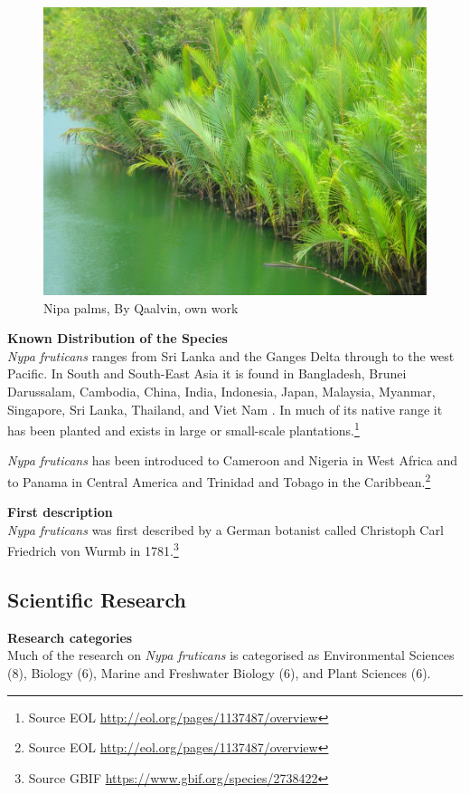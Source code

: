 \documentclass[openany]{book}
\let\rmarkdownfootnote\footnote%
\def\footnote{\protect\rmarkdownfootnote}
\theoremstyle{definition}
\theoremstyle{definition}
\theoremstyle{definition}
\theoremstyle{remark}
\begin{document}
\begin{figure}

{\centering \includegraphics[width=0.7\linewidth]{images_species/Nipa_palms} 

}

\caption{Nipa palms, By Qaalvin, own work}\label{fig:unnamed-chunk-6}
\end{figure}

\textbf{Known Distribution of the Species}\\
\emph{Nypa fruticans} ranges from Sri Lanka and the Ganges Delta through
to the west Pacific. In South and South-East Asia it is found in
Bangladesh, Brunei Darussalam, Cambodia, China, India, Indonesia, Japan,
Malaysia, Myanmar, Singapore, Sri Lanka, Thailand, and Viet Nam . In
much of its native range it has been planted and exists in large or
small-scale plantations.\footnote{Source EOL
  \url{http://eol.org/pages/1137487/overview}}

\emph{Nypa fruticans} has been introduced to Cameroon and Nigeria in
West Africa and to Panama in Central America and Trinidad and Tobago in
the Caribbean.\footnote{Source EOL
  \url{http://eol.org/pages/1137487/overview}}

\textbf{First description}\\
\emph{Nypa fruticans} was first described by a German botanist called
Christoph Carl Friedrich von Wurmb in 1781.\footnote{Source GBIF
  \url{https://www.gbif.org/species/2738422}}

\hypertarget{scientific-research-4}{%
\subsection{Scientific Research}\label{scientific-research-4}}

\textbf{Research categories}\\
Much of the research on \emph{Nypa fruticans} is categorised as
Environmental Sciences (8), Biology (6), Marine and Freshwater Biology
(6), and Plant Sciences (6).
\end{document}
